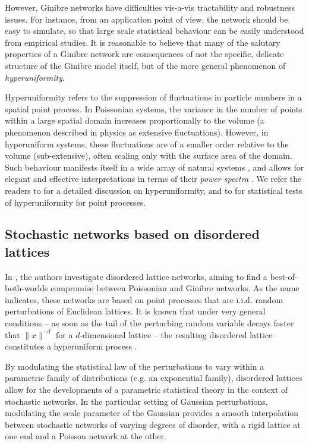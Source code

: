 However, Ginibre networks have difficulties vis-a-vis tractability and robustness issues. For instance, from an application point of view, the network should be easy to simulate, so that large scale statistical behaviour can be easily understood from empirical studies. It is reasonable to believe that many of the salutary properties of a Ginibre network are consequences of not the specific, delicate structure of the Ginibre model itself, but of the more general phenomenon of \textit{hyperuniformity}. 

Hyperuniformity refers to the suppression of fluctuations in particle numbers in a spatial point process. In Poissonian systems, the variance in the number of points within a large spatial domain increases proportionally to the volume (a phenomenon described in physics as extensive fluctuations). However, in hyperuniform systems, these fluctuations are of a smaller order relative to the volume (sub-extensive), often scaling only with the surface area of the domain. Such behaviour manifests itself in a wide array of natural systems  \cite{hough2009zeros, GhoshLebowitz, TORQUATO, torquato2, ghosh-lebowitz-cmp}, and allows for elegant and effective interpretations in terms of their \textit{power spectra}  \cite{PhysRevE,baake, ghoshlebowitz-cmp2}. We refer the readers to \cite{GhoshLebowitz, coste} for a detailed discussion on hyperuniformity, and to \cite{lacieze_hyperuniform} for statistical tests of hyperuniformity for point processes.

\subsection{Stochastic networks based on disordered lattices}
In \cite{ghosh-shirai}, the authors investigate disordered lattice networks, aiming to find a best-of-both-worlds compromise between Poissonian and Ginibre networks. As the name indicates, these networks are based on point processes that are i.i.d. random perturbations of Euclidean lattices. It is known that under very general conditions -- as soon as the tail of the perturbing random variable decays faster that $\|x\|^{-d}$ for a $d$-dimensional lattice -- the resulting disordered lattice constitutes a hyperuniform process \cite{GhoshLebowitz, Ghosh2016NumberRI}. 

By modulating the statistical law of the perturbations to vary within a parametric family of distributions (e.g. an exponential family), disordered lattices allow for the developments of a parametric statistical theory in the context of stochastic networks. In the particular setting of Gaussian perturbations, modulating the scale parameter of the Gaussian provides a smooth interpolation between stochastic networks of varying degrees of disorder, with a rigid lattice at one end and a Poisson network at the other. 

